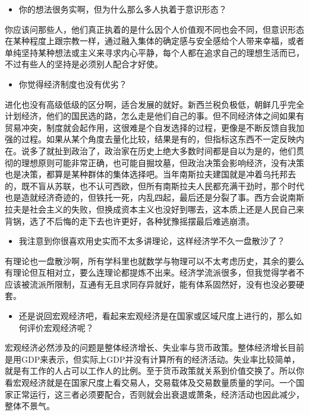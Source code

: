 \documentclass[
  letterpaper,
  DIV=11,
  numbers=noendperiod]{scrreprt}
\providecommand{\tightlist}{%
  \setlength{\itemsep}{0pt}\setlength{\parskip}{0pt}}\usepackage{longtable,booktabs,array}
\begin{document}
\begin{itemize}
\tightlist
\item
  你的想法很务实啊，但为什么那么多人执着于意识形态？
\end{itemize}

你应该问那些人，他们真正执着的是什么因个人价值观不同也会不同，但意识形态在某种程度上跟宗教一样，通过融入集体的确定感与安全感给个人带来幸福，或者单纯坚持某种想法或主义来寻求内心平静，每个人都在追求自己的理想生活而已，不过有些人的坚持是必须别人配合才好使。

\begin{itemize}
\tightlist
\item
  你觉得经济制度也没有优劣？
\end{itemize}

进化也没有高级低级的区分啊，适合发展的就好。新西兰税负极低，朝鲜几乎完全计划经济，他们的国民选的路，怎么走是他们自己的事。但不同经济体之间如果有贸易冲突，制度就会起作用，这很难是个自发选择的过程，更像是不断反馈自我加强的过程。如果从某个角度去量化比较，结果是有的，但指标这东西不一定反映内在。说多了就扯到政治了，政治家在历史上绝大多数时间都是自以为是的，他们贯彻的理想原则可能非常正确，也可能自掘坟墓，但政治决策会影响经济，没有决策也是决策，都算是某种群体的集体选择吧。当年南斯拉夫建国就是冲着乌托邦去的，既不盲从苏联，也不认可西欧，但所有南斯拉夫人民都充满干劲时，那个时代也是造就经济奇迹的，但铁托一死，内乱四起，最后还是分裂了事。西方会说南斯拉夫是社会主义的失败，但换成资本主义也没好到哪去，这本质上还是人民自己来背锅，选了不后悔的走下去也许更好，各种犹豫摇摆最后难逃崩溃。

\begin{itemize}
\tightlist
\item
  我注意到你很喜欢用史实而不太多讲理论，这样经济学不久一盘散沙了？
\end{itemize}

有理论也一盘散沙啊，所有学科里也就数学与物理可以不太考虑历史，其余的要么有理论但互相对立，要么连理论都提炼不出来。经济学流派很多，但我觉得学者不应该被流派所限制，互通有无且求同存异就好，能有体系固然好，没有也没必要硬套。

\begin{itemize}
\tightlist
\item
  还是说回宏观经济吧，看起来宏观经济是在国家或区域尺度上进行的，那么如何评价宏观经济呢？
\end{itemize}

宏观经济必然涉及的问题是整体经济增长、失业率与货币政策。整体经济增长目前是用GDP来表示，但实际上GDP并没有计算所有的经济活动。失业率比较简单，就是有工作的人占可以工作人的比例。至于货币政策就关系到价值交换了。所以你看宏观经济就是在国家尺度上看交易人，交易载体及交易数量质量的学问。一个国家正常运行，这三者必须要配合，否则就会出衰退或萧条，经济活动也因此减少，整体不景气。
\end{document}
